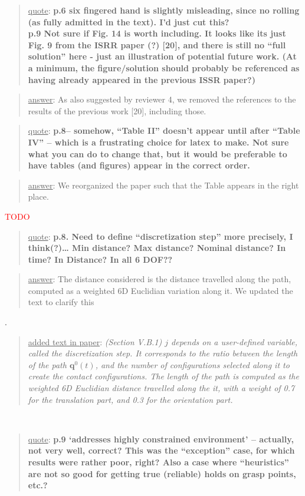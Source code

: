 \documentclass[a4paper]{article}
\newcommand{\done}[0]{}
\newcommand{\ndone}[0]{\textcolor{red}{TODO}}
\newcommand\quot[1]{\begin{quote} \underline{quote}: \textbf{#1}\end{quote}}
\newcommand\as[1]{\begin{quote} \underline{answer}: {#1}\end{quote} }
\newcommand\qt[1]{\begin{quote} \underline{added text in paper}: \textit{#1}\end{quote} \leavevmode \\ }
\begin{document}
\quot{
p.6 six fingered hand is slightly misleading, since no rolling (as fully admitted in the text). I'd just cut this? \\
p.9 Not sure if Fig. 14 is worth including. It looks like its just Fig. 9 from the ISRR paper (?) [20], and there is still no ``full solution'' here -
 just an illustration of potential future work. 
 (At a minimum, the figure/solution should probably be referenced as having already appeared in the previous ISSR paper?)
}

\as{As also suggested by reviewer 4, we removed the references to the results of the previous work [20], including those.}\done

\quot{
p.8– somehow, “Table II” doesn’t appear until after “Table IV” – which is a frustrating choice for latex to make. Not sure what you can do to change that, but it would be preferable to have tables (and figures) appear in the correct order.
}

\as{We reorganized the paper such that the Table appears in the right place.}\ndone

\quot{
p.8. Need to define ``discretization step'' more precisely, I think(?)… Min distance? Max distance? Nominal distance? In time? In Distance? In all 6 DOF??
}

\as{The distance considered is the distance travelled along the path, computed as a weighted 6D Euclidian variation along it. We updated the text to clarify this}.
\qt{(Section V.B.1) $j$ depends on a user-defined variable, called the discretization step. It corresponds to the ratio between the length of the path $\mathbf{q}^0(t)$, and the number
of configurations selected along it to create the contact configurations. The length of the path is computed as the weighted 6D Euclidian distance
travelled along the it, with a weight of 0.7 for the translation part, and 0.3
for the orientation part.}

\quot{
p.9 ‘addresses highly constrained environment’ – actually, not very well, correct? This was the “exception” case, for which results were rather poor, right? Also a case where “heuristics” are not so good for getting true (reliable) holds on grasp points, etc.?
}
\end{document}

